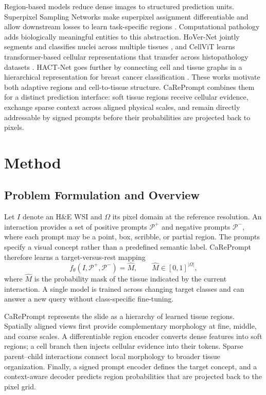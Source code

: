 \documentclass[letterpaper]{article} %
\begin{document}
Region-based models reduce dense images to structured prediction units. Superpixel Sampling Networks make superpixel assignment differentiable and allow downstream losses to learn task-specific regions \cite{jampani2018ssn}. Computational pathology adds biologically meaningful entities to this abstraction. HoVer-Net jointly segments and classifies nuclei across multiple tissues \cite{graham2019hover}, and CellViT learns transformer-based cellular representations that transfer across histopathology datasets \cite{horst2024cellvit}. HACT-Net goes further by connecting cell and tissue graphs in a hierarchical representation for breast cancer classification \cite{pati2022hact}. These works motivate both adaptive regions and cell-to-tissue structure. CaRePrompt combines them for a distinct prediction interface: soft tissue regions receive cellular evidence, exchange sparse context across aligned physical scales, and remain directly addressable by signed prompts before their probabilities are projected back to pixels.

\section{Method}

\subsection{Problem Formulation and Overview}

Let $I$ denote an H\&E WSI and $\Omega$ its pixel domain at the reference resolution. An interaction provides a set of positive prompts $\mathcal{P}^{+}$ and negative prompts $\mathcal{P}^{-}$, where each prompt may be a point, box, scribble, or partial region. The prompts specify a visual concept rather than a predefined semantic label. CaRePrompt therefore learns a target-versus-rest mapping
\begin{equation}
    f_{\theta}(I,\mathcal{P}^{+},\mathcal{P}^{-}) = \hat{M},
    \qquad \hat{M}\in[0,1]^{|\Omega|},
\end{equation}
where $\hat{M}$ is the probability mask of the tissue indicated by the current interaction. A single model is trained across changing target classes and can answer a new query without class-specific fine-tuning.

CaRePrompt represents the slide as a hierarchy of learned tissue regions. Spatially aligned views first provide complementary morphology at fine, middle, and coarse scales. A differentiable region encoder converts dense features into soft regions; a cell branch then injects cellular evidence into their tokens. Sparse parent--child interactions connect local morphology to broader tissue organization. Finally, a signed prompt encoder defines the target concept, and a context-aware decoder predicts region probabilities that are projected back to the pixel grid.
\end{document}
